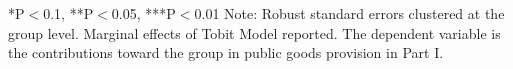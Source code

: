 \begin{table}[htbp]
\begin{left}
\begin{tabular}{c c c c}
\end{tabular}
\begin{footnotesize}
\newline
*P$<$0.1, **P$<$0.05, ***P$<$0.01
\newline
Note: Robust standard errors clustered at the group level. Marginal effects of Tobit Model reported.
\newline
The dependent variable is the contributions toward the group in public goods provision in Part I.\end{footnotesize}
\end{left}

\end{table}